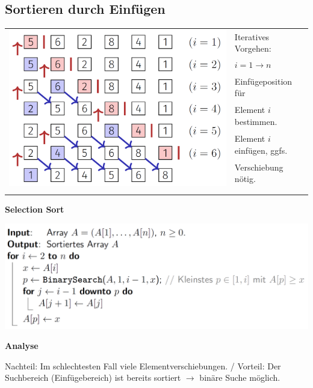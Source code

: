 \begin{sectionbox}
\subsection{Sortieren durch Einfügen}\smallskip
\begin{tabular*}{\columnwidth}{@{\extracolsep\fill}ll@{}}
\multirow{7}{*}{\includegraphics[width = 0.55\columnwidth]{../img/InsSort.png}}
& Iteratives Vorgehen: \\
& $i=1\rightarrow n$ \smallskip \\
& Einfügeposition für \\
& Element $i$ bestimmen. \smallskip\\
& Element $i$ einfügen, ggfs.\\
& Verschiebung nötig. \smallskip\\
& \\
& \\
\end{tabular*}\smallskip

\textbf{Selection Sort}\par
\includegraphics[width = \columnwidth]{../img/InsSortCode.png}\par\smallskip

\textbf{Analyse}\par
Nachteil: Im schlechtesten Fall viele Elementverschiebungen. / Vorteil:  Der Suchbereich (Einfügebereich) ist bereits sortiert $\rightarrow$ binäre Suche möglich.

\end{sectionbox}

